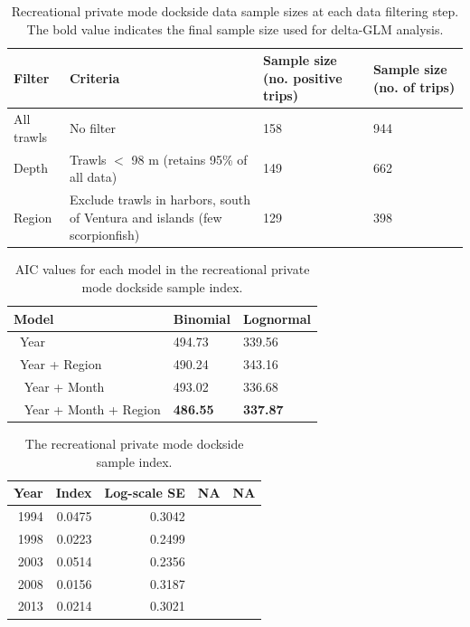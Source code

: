 \documentclass[12pt,]{article}
\begin{document}
\begin{table}[ht]
\centering
\caption{Recreational private mode dockside data sample 
                                          sizes at each data filtering step.  
                                          The bold value indicates the final sample size 
                                          used for delta-GLM analysis.} 
\label{tab:Fleet11_SCBSurvey_filter}
\begin{tabular}{>{\raggedright}p{1.5in}>{\raggedright}p{2.6in}>{\raggedright}p{1in}>{\raggedright}p{1in}}
  \hline
Filter & Criteria & Sample size (no. positive trips) & Sample size (no. of trips) \\ 
  \hline
All trawls & No filter & 158 & 944 \\ 
  Depth & Trawls $<$ 98 m (retains 95\% of all data) & 149 & 662 \\ 
  Region & Exclude trawls in harbors, south of Ventura and islands (few scorpionfish) & 129 & 398 \\ 
   \hline
\end{tabular}
\end{table}\begin{table}[ht]
\centering
\caption{AIC values for each model in the
                                          recreational private mode dockside sample 
                                          index.} 
\label{tab:Fleet11_SCBSurvey_aic}
\begin{tabular}{lll}
  \hline
Model & Binomial & Lognormal \\ 
  \hline
~Year & 494.73 & 339.56 \\ 
  ~Year + Region & 490.24 & 343.16 \\ 
  ~ Year + Month & 493.02 & 336.68 \\ 
  ~ Year + Month + Region & \textbf{486.55} & \textbf{337.87} \\ 
   \hline
\end{tabular}
\end{table}\begin{table}[ht]
\centering
\caption{The recreational private mode 
                                            dockside sample index.} 
\label{tab:Fleet11_SCBSurvey_index}
\begin{tabular}{rrrll}
  \hline
Year & Index & Log-scale SE & NA & NA \\ 
  \hline
 1994 & 0.0475 & 0.3042 &  &  \\ 
   1998 & 0.0223 & 0.2499 &  &  \\ 
   2003 & 0.0514 & 0.2356 &  &  \\ 
   2008 & 0.0156 & 0.3187 &  &  \\ 
   2013 & 0.0214 & 0.3021 &  &  \\ 
   \hline
\end{tabular}
\end{table}
\end{document}

